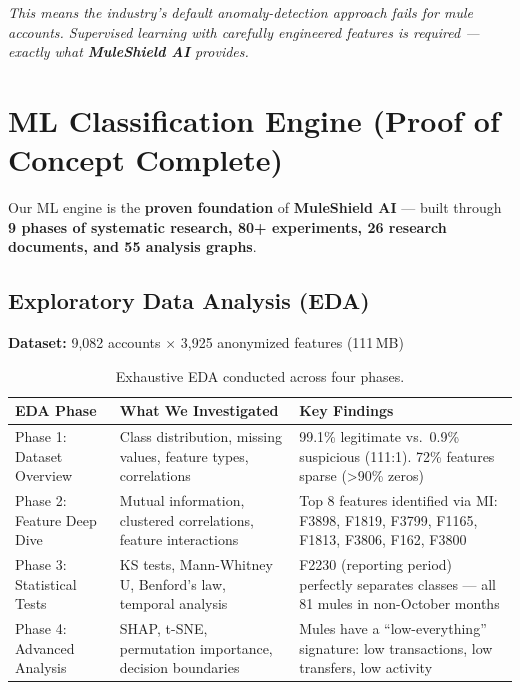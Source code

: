 \documentclass[11pt, a4paper]{article}
\newcommand{\muleshield}{\textbf{\textcolor{mainblue}{MuleShield AI}}}
\begin{document}
\noindent\textit{This means the industry's default anomaly-detection approach fails for mule accounts. Supervised learning with carefully engineered features is required --- exactly what \muleshield{} provides.}


\section{ML Classification Engine \textnormal{\small(Proof of Concept Complete)}}

Our ML engine is the \textbf{proven foundation} of \muleshield{} --- built through \textbf{9 phases of systematic research, 80+ experiments, 26 research documents, and 55 analysis graphs}.

\subsection{Exploratory Data Analysis (EDA)}

\textbf{Dataset:} 9,082 accounts $\times$ 3,925 anonymized features (111\,MB)

\begin{table}[H]
\centering
\small
{}
\begin{tabularx}{\textwidth}{L{3.2cm} L{5cm} Y}
\toprule
{}
\textbf{EDA Phase} & \textbf{What We Investigated} & \textbf{Key Findings} \\
\midrule
Phase 1: Dataset Overview & Class distribution, missing values, feature types, correlations & 99.1\% legitimate vs.\ 0.9\% suspicious (111:1). 72\% features sparse ({>}90\% zeros) \\
Phase 2: Feature Deep Dive & Mutual information, clustered correlations, feature interactions & Top 8 features identified via MI: F3898, F1819, F3799, F1165, F1813, F3806, F162, F3800 \\
Phase 3: Statistical Tests & KS tests, Mann-Whitney U, Benford's law, temporal analysis & F2230 (reporting period) perfectly separates classes --- all 81 mules in non-October months \\
Phase 4: Advanced Analysis & SHAP, t-SNE, permutation importance, decision boundaries & Mules have a ``low-everything'' signature: low transactions, low transfers, low activity \\
\bottomrule
\end{tabularx}
\caption{Exhaustive EDA conducted across four phases.}
\end{table}
\end{document}

